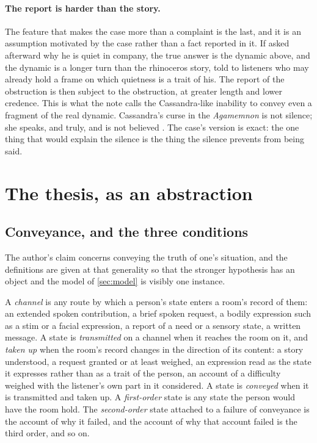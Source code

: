 \paragraph{The report is harder than the story.} The feature that makes the case more than a complaint is the last, and it is an assumption motivated by the case rather than a fact reported in it. If asked afterward why he is quiet in company, the true answer is the dynamic above, and the dynamic is a longer turn than the rhinoceros story, told to listeners who may already hold a frame on which quietness is a trait of his. The report of the obstruction is then subject to the obstruction, at greater length and lower credence. This is what the note calls the Cassandra-like inability to convey even a fragment of the real dynamic. Cassandra's curse in the \emph{Agamemnon} is not silence; she speaks, and truly, and is not believed \cite{Aeschylus}. The case's version is exact: the one thing that would explain the silence is the thing the silence prevents from being said.

\section{The thesis, as an abstraction}\label{sec:abstraction}

\subsection{Conveyance, and the three conditions}

The author's claim concerns conveying the truth of one's situation, and the definitions are given at that generality so that the stronger hypothesis has an object and the model of \autoref{sec:model} is visibly one instance.

\begin{definition}\label{def:conveyance}
A \emph{channel} is any route by which a person's state enters a room's record of them: an extended spoken contribution, a brief spoken request, a bodily expression such as a stim or a facial expression, a report of a need or a sensory state, a written message. A state is \emph{transmitted} on a channel when it reaches the room on it, and \emph{taken up} when the room's record changes in the direction of its content: a story understood, a request granted or at least weighed, an expression read as the state it expresses rather than as a trait of the person, an account of a difficulty weighed with the listener's own part in it considered. A state is \emph{conveyed} when it is transmitted and taken up. A \emph{first-order} state is any state the person would have the room hold. The \emph{second-order} state attached to a failure of conveyance is the account of why it failed, and the account of why that account failed is the third order, and so on.
\end{definition}

